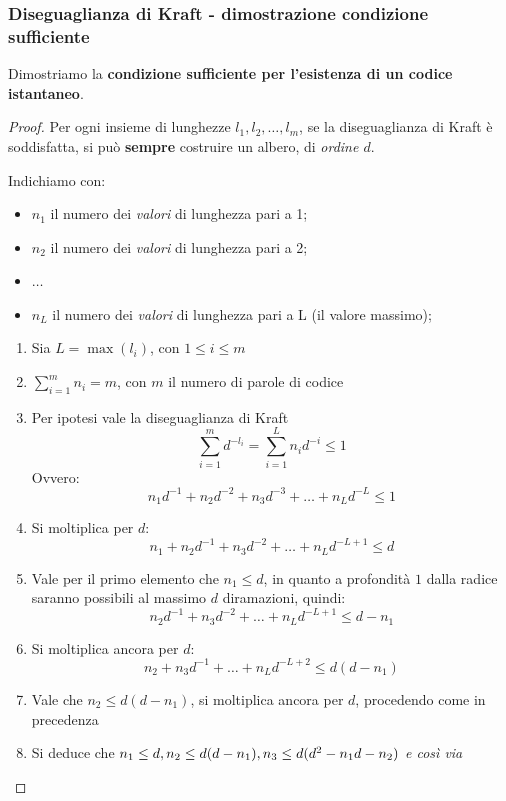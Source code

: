 \subsubsection{Diseguaglianza di Kraft - dimostrazione condizione sufficiente}
Dimostriamo la \textbf{condizione sufficiente per l'esistenza di un codice istantaneo}.

\begin{proof}
Per ogni insieme di lunghezze $l_1,l_2,\dots,l_m$, se la diseguaglianza di Kraft è soddisfatta, si può \textbf{sempre} costruire un albero, di \textit{ordine $d$}.

Indichiamo con:
\begin{itemize}
    \item $n_1$ il numero dei \textit{valori} di lunghezza pari a 1;
    \item $n_2$ il numero dei \textit{valori} di lunghezza pari a 2;
    \item $\dots$
    \item $n_L$ il numero dei \textit{valori} di lunghezza pari a L (il valore massimo);
\end{itemize}


\begin{enumerate}[label=\textbf{Passo \arabic*.}]
    \item Sia $L=\max(l_i)$, con $1\leq i \leq m$
    \item $\sum_{i=1}^m n_i=m$, con $m$ il numero di parole di codice
    \item Per ipotesi vale la diseguaglianza di Kraft
    $$\sum_{i=1}^m d^{-l_i}= \sum_{i=1}^L n_i d^{-i} \leq 1$$
    Ovvero:
    $$ n_1d^{-1} + n_2d^{-2} + n_3d^{-3} + \dots + n_Ld^{-L} \leq 1$$
    \item Si moltiplica per $d$:
    $$ n_1 + n_2d^{-1} + n_3d^{-2} + \dots + n_Ld^{-L+1} \leq d$$
    \item Vale per il primo elemento che $n_1 \leq d$, in quanto a profondità $1$ dalla radice saranno possibili al massimo $d$ diramazioni, quindi:
    $$ n_2d^{-1} + n_3d^{-2} + \dots + n_Ld^{-L+1} \leq d - n_1$$
    
    \item Si moltiplica ancora per $d$:
     $$ n_2+ n_3d^{-1} + \dots + n_Ld^{-L+2} \leq d(d-n_1)$$

    \item Vale che $n_2 \leq d(d-n_1)$, si moltiplica ancora per $d$, procedendo come in precedenza

    \item Si deduce che $n_1 \leq d,\space n_2\leq d(d-n_1),\space n_3\leq d(d^2-n_1d-n_2)$ \textit{e così via}


\end{enumerate}
\end{proof}
